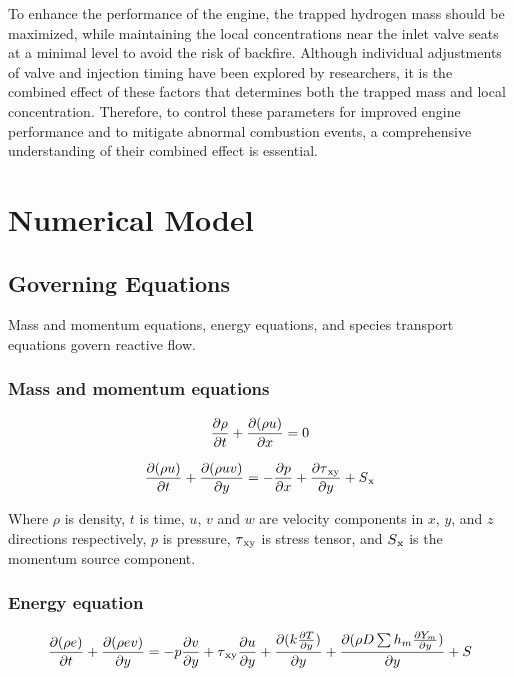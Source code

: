 \documentclass[conference]{IEEEtran}
\begin{document}
To enhance the performance of the engine, the trapped hydrogen mass should be maximized, while maintaining the local concentrations near the inlet valve seats at a minimal level to avoid the risk of backfire. 
Although individual adjustments of valve and injection timing have been explored by researchers, it is the combined effect of these factors that determines both the trapped mass and local concentration. 
Therefore, to control these parameters for improved engine performance and to mitigate abnormal combustion events, a comprehensive understanding of their combined effect is essential.


\section{Numerical Model}
\subsection{Governing Equations}
Mass and momentum equations, energy equations, and species transport equations govern reactive flow.

\subsubsection{Mass and momentum equations}

    \begin{gather*}
        \pdv{\rho}{t} + \pdv{(\rho u)}{ x} = 0
    \end{gather*}

    \begin{gather*}
        \pdv{(\rho u)}{t} + \pdv{(\rho uv)}{y} = - \pdv{p}{x} + \pdv{\tau\textsubscript{xy}}{y} + S\textsubscript{x}
    \end{gather*}

Where $\rho$ is density, $t$ is time, $u$, $v$ and $w$ are velocity components in $x$, $y$, and $z$ directions respectively, 
$p$ is pressure, $\tau\textsubscript{xy}$ is stress tensor, and $S\textsubscript{x}$ is the momentum source component.\\

\subsubsection{Energy equation}

    \begin{gather*}
        \pdv{(\rho e)}{t} + \pdv{(\rho ev)}{y} = -p \pdv{v}{y} + \tau \textsubscript{xy} \pdv{u}{y} + \pdv{(k \pdv{T}{y})}{y} + \pdv{(\rho D \sum h_m \pdv{Y_m}{y})}{y} + S
    \end{gather*}
\end{document}
